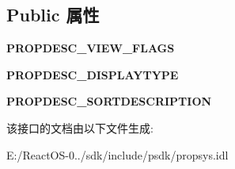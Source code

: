 \subsection*{Public 属性}
\begin{DoxyCompactItemize}
\item 
\mbox{\label{interface_i_property_description_a51fcc009c11537d83a29ead02571d388}} 
{\bfseries P\+R\+O\+P\+D\+E\+S\+C\+\_\+\+V\+I\+E\+W\+\_\+\+F\+L\+A\+GS}
\item 
\mbox{\label{interface_i_property_description_ac2dcd815e89730a52292549fbc25bf15}} 
{\bfseries P\+R\+O\+P\+D\+E\+S\+C\+\_\+\+D\+I\+S\+P\+L\+A\+Y\+T\+Y\+PE}
\item 
\mbox{\label{interface_i_property_description_ad3cafdfe22a5e6da580f88adbc826e2d}} 
{\bfseries P\+R\+O\+P\+D\+E\+S\+C\+\_\+\+S\+O\+R\+T\+D\+E\+S\+C\+R\+I\+P\+T\+I\+ON}
\end{DoxyCompactItemize}


该接口的文档由以下文件生成\+:\begin{DoxyCompactItemize}
\item 
E\+:/\+React\+O\+S-\/0../sdk/include/psdk/propsys.\+idl\end{DoxyCompactItemize}
